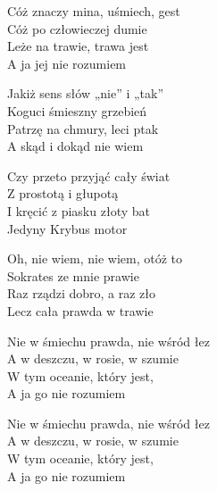 \begin{text}
    Cóż znaczy mina, uśmiech, gest\\
    Cóż po człowieczej dumie\\
    Leże na trawie, trawa jest\\
    A ja jej nie rozumiem

    Jakiż sens słów „nie” i „tak”\\
    Koguci śmieszny grzebień\\
    Patrzę na chmury, leci ptak\\
    A skąd i dokąd nie wiem

    Czy przeto przyjąć cały świat\\
    Z prostotą i głupotą\\
    I kręcić z piasku złoty bat\\
    Jedyny Krybus motor

    Oh, nie wiem, nie wiem, otóż to\\
    Sokrates ze mnie prawie\\
    Raz rządzi dobro, a raz zło\\
    Lecz cała prawda w trawie

    Nie w śmiechu prawda, nie wśród łez\\
    A w deszczu, w rosie, w szumie\\
    W tym oceanie, który jest,\\
    A ja go nie rozumiem

    Nie w śmiechu prawda, nie wśród łez\\
    A w deszczu, w rosie, w szumie\\
    W tym oceanie, który jest,\\
    A ja go nie rozumiem
\end{text}
\begin{chord}

\end{chord}